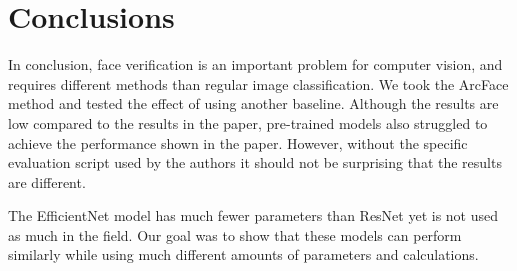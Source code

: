 \documentclass[conference]{IEEEtran}
\begin{document}
\section{Conclusions}
In conclusion, face verification is an important problem for computer vision, and requires different
methods than regular image classification.
We took the ArcFace method and tested the effect of using another baseline.
Although the results are low compared to the results in the paper, pre-trained models also struggled to 
achieve the performance shown in the paper.
However, without the specific evaluation script used by the authors it should not be surprising that the results
are different.

The EfficientNet model has much fewer parameters than ResNet yet is not used as much in the field.
Our goal was to show that these models can perform similarly while using much different amounts of parameters
and calculations.
\printbibliography
\end{document}
